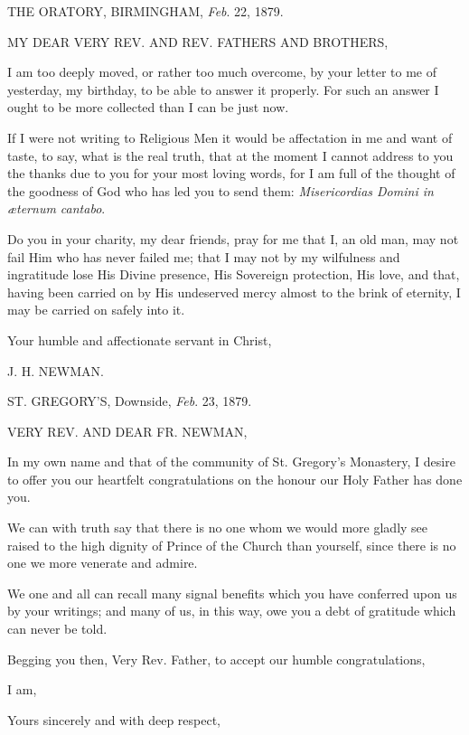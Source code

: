 
THE ORATORY, BIRMINGHAM,
\emph{Feb}. 22, 1879.

MY DEAR VERY
REV. AND REV.
FATHERS AND BROTHERS,

I am too deeply moved, or rather too much overcome, by your letter to
me of yesterday, my birthday, to be able to answer it properly. For
such an answer I ought to be more collected than I can be just now.

If I were not writing to Religious Men it would be affectation in
me and want of taste, to say, what is the real truth, that at the
moment I cannot address to you the thanks due to you for your most
loving words, for I am full of the thought of the goodness of God who
has led you to send them: \emph{Misericordias Domini in æternum cantabo}.

Do you in your charity, my dear friends, pray for me that I, an old
man, may not fail Him who has never failed me; that I may not by my
wilfulness and ingratitude lose His Divine presence, His Sovereign
protection, His love, and that, having been carried on by His
undeserved mercy almost to the brink of eternity, I may be carried on
safely into it.

Your humble and affectionate servant in Christ,

J. H. NEWMAN.


ST. GREGORY'S,
Downside, \emph{Feb}. 23, 1879.

VERY REV. AND
DEAR FR. NEWMAN,

In my own name and that of the community of St. Gregory's Monastery, I
desire to offer you our heartfelt congratulations on the honour our
Holy Father has done you.

We can with truth say that there is no one whom we would more
gladly see raised to the high dignity of Prince of the Church than
yourself, since there is no one we more venerate and admire.

We one and all can recall many signal benefits which you have
conferred upon us by your writings; and many of us, in this way, owe
you a debt of gratitude which can never be told.

Begging you then, Very Rev. Father, to accept our humble
congratulations,

I am,

Yours sincerely and with deep respect,

